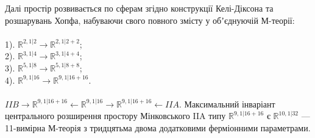 Далі простір розвивається по сферам згідно конструкції Келі-Діксона
та розшарувань Хопфа, набуваючи свого повного змісту у обʼєднуючій М-теорії:
\\
\\
1). $\mathbb{R}^{2,1|2} \rightarrow \mathbb{R}^{2,1|2+2}$;\\
2). $\mathbb{R}^{3,1|4} \rightarrow \mathbb{R}^{3,1|4+4}$;\\
3). $\mathbb{R}^{5,1|8} \rightarrow \mathbb{R}^{5,1|8+8}$;\\
4). $\mathbb{R}^{9,1|16} \rightarrow \mathbb{R}^{9,1|16+16}$.\\
\\
$IIB \rightarrow \mathbb{R}^{9,1|16+16} \leftarrow \mathbb{R}^{9,1|16} \rightarrow \mathbb{R}^{9,1|16+16} \leftarrow IIA$.
Максимальний інваріант центрального розширення простору
Мінковського IIA типу $\mathbb{R}^{9,1|16+16}$ є $\mathbb{R}^{10,1|32}$ — 11-вимірна
М-теорія з тридцятьма двома додатковими ферміонними параметрами.
